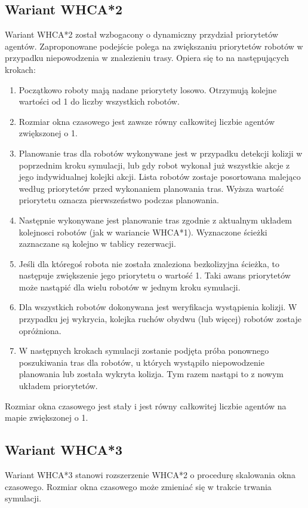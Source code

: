 
\subsection{Wariant WHCA*2}
Wariant WHCA*2 został wzbogacony o dynamiczny przydział priorytetów agentów.
Zaproponowane podejście polega na zwiększaniu priorytetów robotów w przypadku niepowodzenia w znalezieniu trasy.
Opiera się to na następujących krokach:
\begin{enumerate}
	\item Początkowo roboty mają nadane priorytety losowo. Otrzymują kolejne wartości od 1 do liczby wszystkich robotów.
	\item Rozmiar okna czasowego jest zawsze równy całkowitej liczbie agentów zwiększonej o 1.
	\item Planowanie tras dla robotów wykonywane jest w przypadku detekcji kolizji w poprzednim kroku symulacji, lub gdy robot wykonał już wszystkie akcje z jego indywidualnej kolejki akcji.
	Lista robotów zostaje posortowana malejąco według priorytetów przed wykonaniem planowania tras. Wyższa wartość priorytetu oznacza pierwszeństwo podczas planowania.
	\item Następnie wykonywane jest planowanie tras zgodnie z aktualnym układem kolejnosci robotów (jak w wariancie WHCA*1). Wyznaczone ścieżki zaznaczane są kolejno w tablicy rezerwacji.
	\item Jeśli dla któregoś robota nie została znaleziona bezkolizyjna ścieżka, to następuje zwiększenie jego priorytetu o wartość 1. Taki awans priorytetów może nastąpić dla wielu robotów w jednym kroku symulacji.
	\item Dla wszystkich robotów dokonywana jest weryfikacja wystąpienia kolizji. W przypadku jej wykrycia, kolejka ruchów obydwu (lub więcej) robotów zostaje opróżniona.
	\item W następnych krokach symulacji zostanie podjęta próba ponownego poszukiwania tras dla robotów, u których wystąpiło niepowodzenie planowania lub została wykryta kolizja. Tym razem nastąpi to z nowym układem priorytetów.
\end{enumerate}

Rozmiar okna czasowego jest stały i jest równy całkowitej liczbie agentów na mapie zwiększonej o 1.

\subsection{Wariant WHCA*3}
Wariant WHCA*3 stanowi rozszerzenie WHCA*2 o procedurę skalowania okna czasowego.
Rozmiar okna czasowego może zmieniać się w trakcie trwania symulacji.


